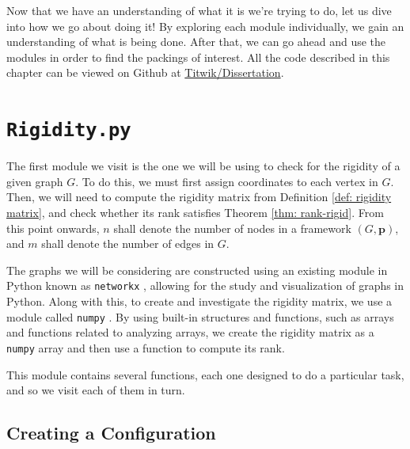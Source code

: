 \begin{flushleft}
    Now that we have an understanding of what it is we're trying to do, let us dive into how we go about doing it! By exploring each module individually, we gain an understanding of what is being done. After that, we can go ahead and use the modules in order to find the packings of interest. All the code described in this chapter can be viewed on Github at \href{https://github.com/Titwik/Dissertation}{Titwik/Dissertation}.
\end{flushleft}    

\section{\texttt{Rigidity.py}}

\begin{flushleft}
The first module we visit is the one we will be using to check for the rigidity of a given graph $G$. To do this, we must first assign coordinates to each vertex in $G$. Then, we will need to compute the rigidity matrix from Definition \ref{def: rigidity matrix}, and check whether its rank satisfies Theorem \ref{thm: rank-rigid}. From this point onwards, $n$ shall denote the number of nodes in a framework $(G,\textbf{p})$, and $m$ shall denote the number of edges in $G$. 
\end{flushleft}

\begin{flushleft}
The graphs we will be considering are constructed using an existing module in Python known as \texttt{networkx} \cite{networkx}, allowing for the study and visualization of graphs in Python. Along with this, to create and investigate the rigidity matrix, we use a module called \texttt{numpy} \cite{numpy}. By using built-in structures and functions, such as arrays and functions related to analyzing arrays, we create the rigidity matrix as a \texttt{numpy} array and then use a function to compute its rank.
\end{flushleft}

\begin{flushleft}
This module contains several functions, each one designed to do a particular task, and so we visit each of them in turn.
\end{flushleft}

\subsection{Creating a Configuration}


